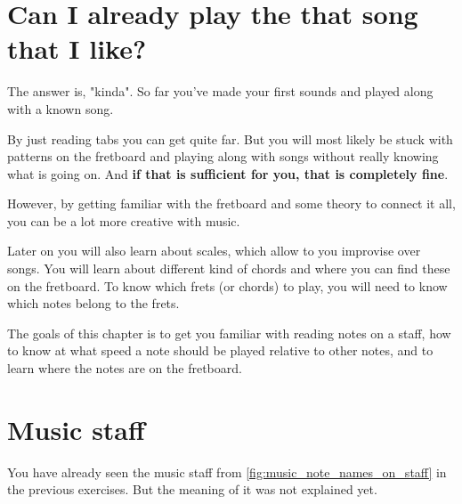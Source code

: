 \section{Can I already play the that song that I like?}

The answer is, "kinda". So far you've made your first sounds and played along with a known song.

By just reading tabs you can get quite far. But you will most likely be stuck with patterns on the fretboard and playing along with songs without really knowing what is going on. And \textbf{if that is sufficient for you, that is completely fine}.

However, by getting familiar with the fretboard and some theory to connect it all, you can be a lot more creative with music.

Later on you will also learn about scales, which allow to you improvise over songs. You will learn about different kind of chords and where you can find these on the fretboard. To know which frets (or chords) to play, you will need to know which notes belong to the frets.

The goals of this chapter is to get you familiar with reading notes on a staff, how to know at what speed a note should be played relative to other notes, and to learn where the notes are on the fretboard.

\section{Music staff}

You have already seen the music staff from \autoref{fig:music_note_names_on_staff} in the previous exercises. But the meaning of it was not explained yet.

